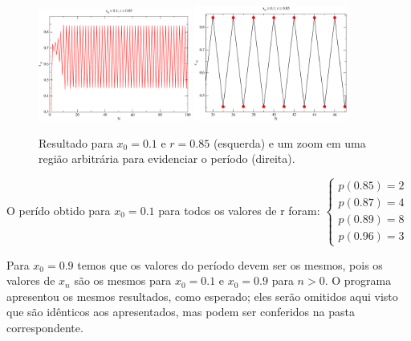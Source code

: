 \documentclass[a4wide]{report}
\begin{document}
\begin{figure}[!htb]
\centering
\includegraphics[width=0.447\textwidth]{085.pdf}
\includegraphics[width=0.447\textwidth]{085zoom.pdf}
\caption{Resultado para $x_0 = 0.1$ e $r = 0.85$ (esquerda) e um zoom em uma região arbitrária para evidenciar o período (direita). }
\label{085}
\end{figure}

O perído obtido para $x_0 = 0.1$ para todos os valores de r foram:
$\begin{cases} 
p(0.85) = 2 \\ 
p(0.87) = 4 \\
p(0.89) = 8 \\
p(0.96) = 3
\end{cases} $

Para $x_0 = 0.9$ temos que os valores do período devem ser os mesmos, pois os valores de $x_n$ são os mesmos para $x_0 = 0.1$ e $x_0 = 0.9$ para $n > 0$. O programa apresentou os mesmos resultados, como esperado; eles serão omitidos aqui visto que são idênticos aos apresentados, mas podem ser conferidos na pasta correspondente.
\end{document}
